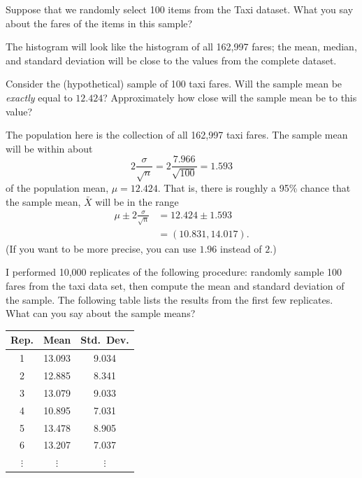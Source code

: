 \documentclass[answers,11pt]{exam}
\begin{document}
\begin{questions}
\question \label{ques:taxi-sample} Suppose that we randomly select 100 items from the Taxi dataset. What you
say about the fares of the items in this sample?

\begin{solution}
  The histogram will look like the histogram of all 162,997 fares; the mean,
  median, and standard deviation will be close to the values from the complete
  dataset.
\end{solution}

\vfill 

\ifprintanswers \else \newpage \fi

\question Consider the (hypothetical) sample of 100 taxi fares. Will the
sample mean be \emph{exactly} equal to $12.424$? Approximately how close will
the sample mean be to this value?

\begin{solution}
  The population here is the collection of all 162,997 taxi fares.
  The sample mean will be within about
  \[
    2 \frac{\sigma}{\sqrt{n}} = 2 \frac{7.966}{\sqrt{100}} = 1.593
  \]
  of the population mean, $\mu = 12.424$. That is, there is roughly a 95\%
  chance that the sample mean, $\bar X$ will be in the range
  \begin{align*}
    \mu \pm 2 \frac{\sigma}{\sqrt{n}}
      &= 12.424 \pm  1.593 \\
      &= (10.831, 14.017).
  \end{align*}
  (If you want to be more precise, you can use $1.96$ instead of $2$.)
  
\end{solution}


\vfill

\question I performed 10,000 replicates of the following procedure:
randomly sample 100 fares from the taxi data set, then compute the mean and
standard deviation of the sample. The following table lists the results from
the first few replicates. What can you say about the sample means?

\vspace{\baselineskip}
\begin{tabular}{ccc}
  \toprule
  Rep. & Mean & Std.~Dev. \\
  \midrule
  1 & 13.093 & 9.034 \\
  2 & 12.885 & 8.341 \\
  3 & 13.079 & 9.033 \\
  4 & 10.895 & 7.031 \\
  5 & 13.478 & 8.905 \\
  6 & 13.207 & 7.037 \\
  $\vdots$ & $\vdots$ & $\vdots$ \\
  \bottomrule
\end{tabular}
\vspace{\baselineskip}


\end{questions}
\end{document}
